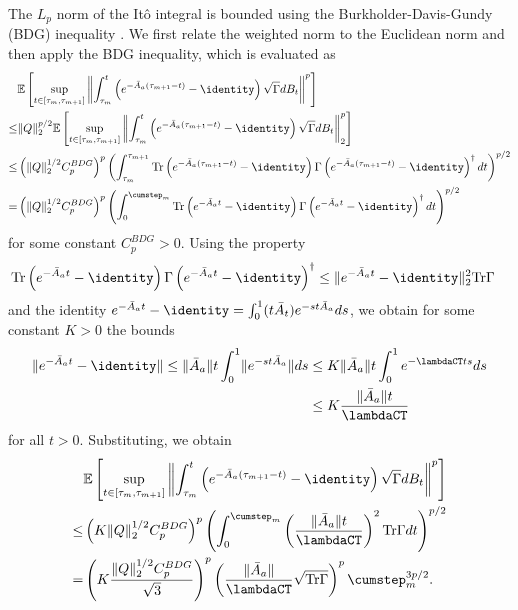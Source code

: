 \documentclass[11pt]{article}
\begin{document}
The $L_p$ norm of the It\^{o} integral is bounded using the Burkholder-Davis-Gundy (BDG) inequality \citep[Theorem 5.16]{le2016brownian}. 
We first relate the weighted norm to the Euclidean norm and then apply the BDG inequality, which is evaluated as
\begin{align*}
    &\mathbb{E}\left[\sup_{t \in [\tau_m, \tau_{m+1}]} \left\lVert  
    \int_{\tau_m}^{t} \left(e^{-\bar{A}_a (\tau_{m+1} - t)} - \identity \right)  \sqrt{\Gamma} dB_t
    \right\rVert^p 
    \right]
    \\ \leq &
    \lVert Q \rVert_2^{p/2}
    \mathbb{E}\left[\sup_{t \in [\tau_m, \tau_{m+1}]} \left\lVert  
    \int_{\tau_m}^{t} \left(e^{-\bar{A}_a (\tau_{m+1} - t)} - \identity \right)  \sqrt{\Gamma} dB_t
    \right\rVert^p_2 
    \right]
    \\
    \leq & 
    \left( \lVert Q \rVert_2^{1/2}C_p^{BDG} \right)^p \left( 
    \int_{\tau_m}^{\tau_{m+1}}\mathrm{Tr}\left(e^{-\bar{A}_a (\tau_{m+1} - t)} - \identity \right) \Gamma \left(e^{-\bar{A}_a (\tau_{m+1} - t)} - \identity \right)^\dagger  dt
    \right)^{p/2} 
    \\ 
    = &
    \left( \lVert Q \rVert_2^{1/2}C_p^{BDG} \right)^p \left( 
    \int_{0}^{\cumstep_m}\mathrm{Tr}\left(e^{-\bar{A}_a t} - \identity \right) \Gamma \left(e^{-\bar{A}_a t} - \identity \right)^\dagger  dt
    \right)^{p/2} 
\end{align*}
for some constant $C_p^{BDG} > 0$. 
Using the property
\begin{align*}
    \mathrm{Tr}\left(e^{-\bar{A}_a t} - \identity \right) \Gamma \left(e^{-\bar{A}_a t} - \identity \right)^\dagger
    &\leq 
    \lVert  e^{-\bar{A}_a t} - \identity  \rVert_2^2 \mathrm{Tr} \Gamma  
\end{align*}
and the identity $e^{-\bar{A}_a t} - \identity = \int_0^1 (t \bar{A}_t) e^{-s t \bar{A}_a} ds $, we obtain for some constant $K > 0$ the bounds
\begin{align*}
    \lVert e^{-\bar{A}_a t} - \identity \rVert
    \leq 
    \lVert \bar{A}_a \rVert t \int_0^1 \lVert e^{-st \bar{A}_a} \rVert  ds 
    &\leq 
    K \lVert \bar{A}_a  \rVert t \int_0^1 e^{-\lambdaCT t s} ds
    \\ &
    \leq
    K \frac{\lVert \bar{A}_a \rVert t}{\lambdaCT} 
\end{align*}
for all $t > 0$. 
Substituting, we obtain 
\begin{align*}
&\mathbb{E}\left[\sup_{t \in [\tau_m, \tau_{m+1}]} \left\lVert  
    \int_{\tau_m}^{t} \left(e^{-\bar{A}_a (\tau_{m+1} - t)} - \identity \right)  \sqrt{\Gamma} dB_t
    \right\rVert^p 
    \right]
    \\ 
    \leq & 
        \left(K \lVert Q \rVert_2^{1/2}C_p^{BDG} \right)^p \left( 
    \int_{0}^{\cumstep_m}\left(\frac{\lVert \bar{A}_a \rVert t}{\lambdaCT} \right)^2 \mathrm{Tr} \Gamma  dt
    \right)^{p/2}     
    \\ 
    = &
    \left(K \frac{\lVert Q \rVert_2^{1/2}C_p^{BDG}}{\sqrt{3}} \right)^p
    \left(\frac{\lVert \bar{A}_a \rVert }{\lambdaCT} \sqrt{\mathrm{Tr} \Gamma} \right)^p
    \cumstep_m^{3p/2} . 
\end{align*}
\end{document}
